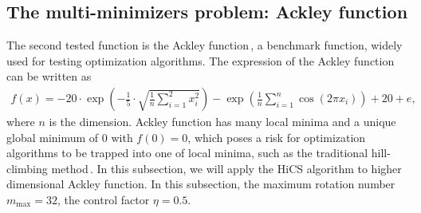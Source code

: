 \documentclass[final,1p,times]{elsarticle}
\begin{document}
\subsection{The multi-minimizers problem: Ackley function}
\label{subsec:minmulit}

The second tested function is the Ackley
function\,\cite{dieterich2012empirical},
a benchmark function, widely used for
testing optimization algorithms.
The expression of the Ackley function can be written as
\begin{align}
	f(x) =
	-20\cdot\exp\left(-\frac{1}{5}\cdot\sqrt{\frac{1}{n}\sum_{i=1}^2
	x_i^2}\right)-
	\exp\left(\frac{1}{n}\sum_{i=1}^n \cos(2\pi x_i)\right)+20+e,
	\label{eqn:ackley}
\end{align}
where $n$ is the dimension.
Ackley function has many local minima and a unique global
minimum of $0$ with $f(0)=0$, which poses a risk for
optimization algorithms to be trapped into one of local
minima, such as the traditional hill-climbing method\,\cite{back1996evolutionary}.
In this subsection, we will apply the HiCS
algorithm to higher dimensional Ackley function. 
In this subsection, the maximum rotation number
$m_{\max}=32$, the control factor $\eta=0.5$.
\end{document}
